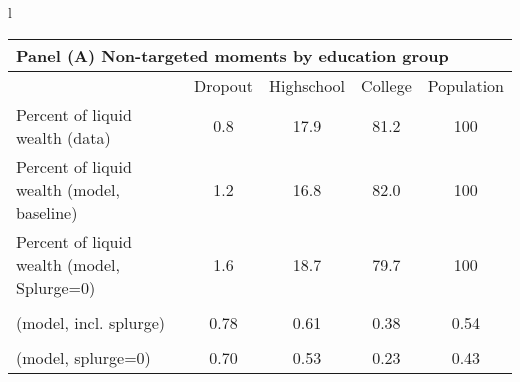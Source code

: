 \documentclass[\econtexRoot/HAFiscal-online-appendix]{subfiles}
\begin{document}
\begin{table}[th]
	\begin{center}
		\begin{tabular}{l}
			\begin{tabular}{lcccc}
				\multicolumn{5}{l}{Panel (A) Non-targeted moments by education group} \\ \midrule
				& Dropout & Highschool & College & Population \\ \midrule
				Percent of liquid wealth (data) & 0.8 & 17.9 & 81.2 & 100 \\
				Percent of liquid wealth (model, baseline) & 1.2 & 16.8 & 82.0 & 100 \\
				Percent of liquid wealth (model, Splurge=0) & 1.6 & 18.7 & 79.7 & 100 \\
				\makecell[l]{Avg. lottery-win-year MPC \\ (model, incl. splurge)} & 0.78 & 0.61 & 0.38 & 0.54 \\ 
				\makecell[l]{Avg. lottery-win-year MPC \\ (model, splurge=0)} & 0.70 & 0.53 & 0.23 & 0.43
				\\ \bottomrule 
			\end{tabular} \\ \\ 
			

\end{tabular}
\end{center}
\end{table}
\end{document}
